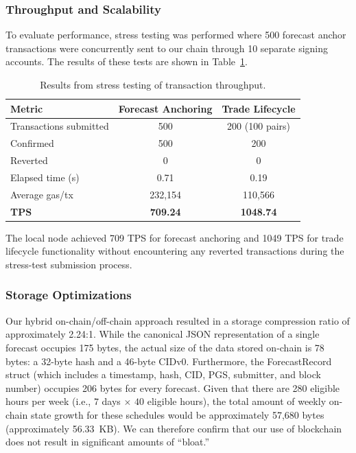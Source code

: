 \documentclass{ieeeaccess}
\begin{document}
\subsubsection{Throughput and Scalability}

To evaluate performance, stress testing was performed where 500 forecast anchor transactions were concurrently sent to our chain through 10 separate signing accounts. The results of these tests are shown in Table~\ref{tab:throughput}.

\begin{table}[!t]
\caption{Results from stress testing of transaction throughput.}
\label{tab:throughput}
\centering
\begin{tabular}{lcc}
\toprule
\textbf{Metric} & \textbf{Forecast Anchoring} & \textbf{Trade Lifecycle} \\
\midrule
Transactions submitted & 500 & 200 (100 pairs) \\
Confirmed & 500 & 200 \\
Reverted & 0 & 0 \\
Elapsed time (s) & 0.71 & 0.19 \\
Average gas/tx & 232,154 & 110,566 \\
\textbf{TPS} & \textbf{709.24} & \textbf{1048.74} \\
\bottomrule
\end{tabular}
\end{table}

The local node achieved 709 TPS for forecast anchoring and 1049 TPS for trade lifecycle functionality without encountering any reverted transactions during the stress-test submission process.

\subsubsection{Storage Optimizations}

Our hybrid on-chain/off-chain approach resulted in a storage compression ratio of approximately 2.24:1. While the canonical JSON representation of a single forecast occupies 175 bytes, the actual size of the data stored on-chain is 78 bytes: a 32-byte hash and a 46-byte CIDv0. Furthermore, the ForecastRecord struct (which includes a timestamp, hash, CID, PGS, submitter, and block number) occupies 206 bytes for every forecast. Given that there are 280 eligible hours per week (i.e., $7$ days $\times$ $40$ eligible hours), the total amount of weekly on-chain state growth for these schedules would be approximately 57,680 bytes (approximately 56.33~KB). We can therefore confirm that our use of blockchain does not result in significant amounts of ``bloat.''
\end{document}

